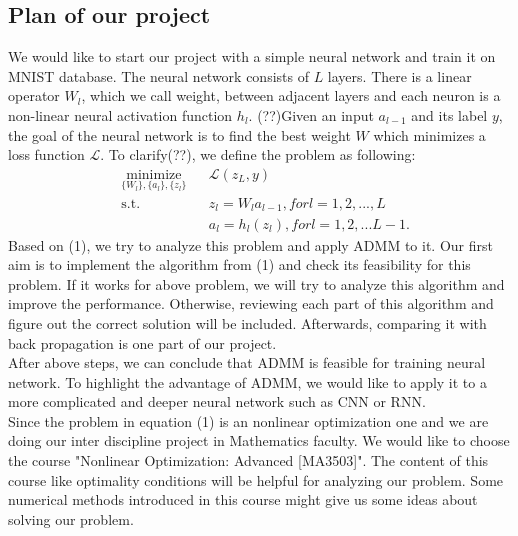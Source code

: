 \documentclass[11pt]{report}
\begin{document}
\subsection*{Plan of our project}
We would like to start our project with a simple neural network and train it on MNIST database. The neural network consists of $L$ layers. There is a linear operator $W_l$, which we call weight, between adjacent layers and each neuron is a non-linear neural activation function $h_l$. (??)Given an input $a_{l-1}$ and its label $y$, the goal of the neural network is to find the best weight $W$ which minimizes a loss function $\mathcal{L}$. To clarify(??), we define the problem as following:
\begin{equation}
\begin{aligned}
& \underset{\{W_l\},\{a_l\}, \{z_l\}}{\text{minimize}}
& & \mathcal{L}(z_L,y) \\
& \text{s.t.}
& & z_l = W_la_{l-1}, for l = 1,2,...,L \\
& & & a_l = h_l(z_l), for l = 1,2,...L-1.
\end{aligned}
\end{equation}
Based on (1), we try to analyze this problem and apply ADMM to it. Our first aim is to implement the algorithm from (1) and check its feasibility for this problem. If it works for above problem, we will try to analyze this algorithm and  improve the performance. Otherwise, reviewing each part of this algorithm and figure out the correct solution will be included. Afterwards, comparing it with back propagation is one part of our project.\\
After above steps, we can conclude that ADMM is feasible for training neural network. To highlight the advantage of ADMM, we would like to apply it to a more complicated and deeper neural network such as CNN or RNN.\\
Since the problem in equation (1) is an nonlinear optimization one and we are doing our inter discipline project in Mathematics faculty. We would like to choose the course "Nonlinear Optimization: Advanced [MA3503]". The content of this course like optimality conditions will be helpful for analyzing our problem. Some numerical methods introduced in this course might give us some ideas about solving our problem.
\end{document}
